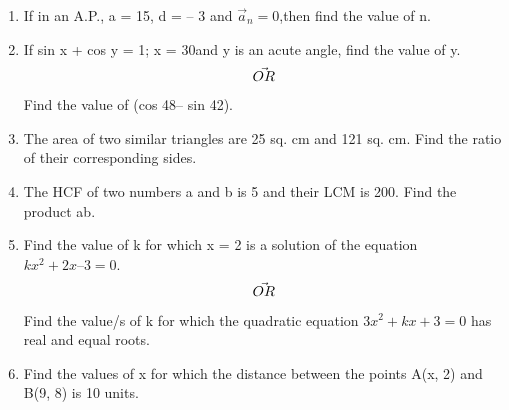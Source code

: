 \documentclass[journal,12pt,twocolumn]{IEEEtran}
\begin{document}
\begin{enumerate}
\item If in an A.P., a = 15, d = – 3 and $\vec{a}_n = 0$,then find the value of n.\\
\item If sin x + cos y = 1; x = 30\textdegree and y is an acute angle, find the value of y.\\ 
\begin{align}
    \centering \vec{OR}\nonumber
\end{align}
 Find the value of (cos 48\textdegree – sin 42\textdegree).
\item The area of two similar triangles are 25 sq. cm and 121 sq. cm. Find the ratio of their corresponding sides.\\ 

\item The HCF of two numbers a and b is 5 and their LCM is 200. Find the product ab.
\item Find the value of k for which x = 2 is a solution of the equation $ kx^2 + 2x – 3 = 0.$
\begin{align}
    \centering \vec{OR}\nonumber
\end{align}
Find the value/s of k for which the quadratic equation $3x^2 + kx + 3 = 0$ has real and equal roots.

 \item Find the values of x for which the distance between the points A(x, 2) and B(9, 8) is 10 units.

\end{enumerate}
\end{document}
